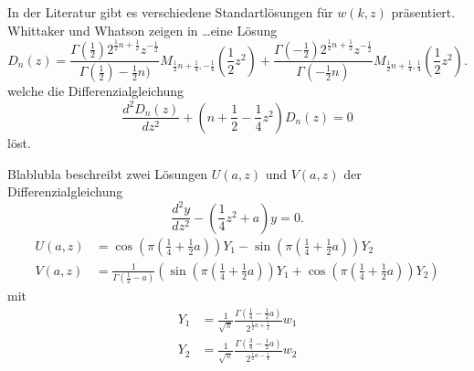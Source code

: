 In der Literatur gibt es verschiedene Standartlösungen für $w(k,z)$ präsentiert.
Whittaker und Whatson zeigen in \dots eine Lösung
\begin{equation}
    D_n(z) = \frac{
            \Gamma \left( {\textstyle \frac{1}{2}}\right) 2^{\frac{1}{2}n + \frac{1}{2}} z^{-\frac{1}{2}}
        }{
            \Gamma \left( {\textstyle \frac{1}{2}} \right) - {\textstyle \frac{1}{2}} n)
        }
        M_{\frac{1}{2} n + \frac{1}{4}, - \frac{1}{4}} \left(\frac{1}{2}z^2\right)
        +
        \frac{
            \Gamma\left(-{\textstyle \frac{1}{2}}\right) 2^{\frac{1}{2}n + \frac{1}{2}} z^{-\frac{1}{2}}
        }{
            \Gamma\left(- {\textstyle \frac{1}{2}} n\right)
        }
        M_{\frac{1}{2} n + \frac{1}{4}, \frac{1}{4}} \left(\frac{1}{2}z^2\right).
\end{equation}
welche die Differenzialgleichung
\begin{equation}
    \frac{d^2D_n(z)}{dz^2} + \left(n + \frac{1}{2} - \frac{1}{4} z^2\right)D_n(z) = 0
\end{equation}
löst.

Blablubla beschreibt zwei Lösungen $U(a, z)$ und $V(a,z)$ der Differenzialgleichung
\begin{equation}
    \frac{d^2 y}{d z^2} - \left(\frac{1}{4} z^2 + a\right) y = 0.
\end{equation}
\begin{align}
    U(a,z) &= 
    \cos\left(\pi \left({\textstyle \frac{1}{4}} + {\textstyle \frac{1}{2}} a\right)\right) Y_1
    - \sin\left(\pi \left({\textstyle \frac{1}{4}} + {\textstyle \frac{1}{2}} a\right)\right) Y_2 \\
    V(a,z) &= \frac{1}{\Gamma \left({\textstyle \frac{1}{2} - a}\right)} \left(
    \sin\left(\pi \left({\textstyle \frac{1}{4}} + {\textstyle \frac{1}{2}} a\right)\right) Y_1
    + \cos\left(\pi \left({\textstyle \frac{1}{4}} + {\textstyle \frac{1}{2}} a\right)\right) Y_2
    \right)
\end{align}
mit
\begin{align}
    Y_1 &= \frac{1}{\sqrt{\pi}} 
            \frac{\Gamma\left({\textstyle \frac{1}{4} - 
            {\textstyle \frac{1}{2}}a}\right)}
            {2^{\frac{1}{2} a + \frac{1}{4}}} w_1\\
    Y_2 &= \frac{1}{\sqrt{\pi}} 
            \frac{\Gamma\left({\textstyle \frac{3}{4} - 
            {\textstyle \frac{1}{2}}a}\right)}
            {2^{\frac{1}{2} a - \frac{1}{4}}} w_2
\end{align}

